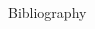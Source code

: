 \documentclass[final,hyperref={pdfpagelabels=false}]{beamer}
\begin{document}
\begin{frame}{}
\begin{columns}[t,totalwidth=\linewidth]
\begin{column}{1\linewidth}
      \end{column}
\vspace{0.1cm}
    

    \end{columns}
                
%            	   
                 \vspace{-0.2cm}
                 \begin{block}{Bibliography}
         	   \vspace{-2.1cm}
%
				   \scriptsize
				   \begin{multicols}{2}[\frametitle{\insertsection} ]
				   

\end{multicols}
\end{block}
\end{frame}
\end{document}
